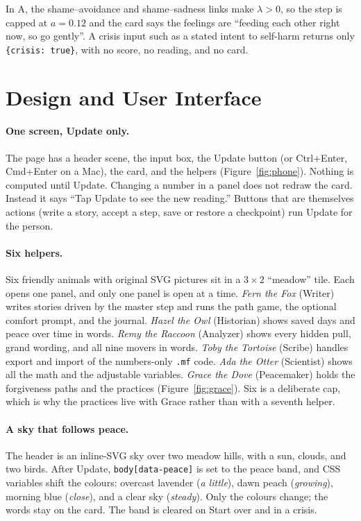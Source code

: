 \documentclass[10pt]{article}
\theoremstyle{definition}
\theoremstyle{remark}
\begin{document}
In A, the shame--avoidance and shame--sadness links make $\lambda>0$, so the step is capped at $a=0.12$ and the card says the feelings are ``feeding each other right now, so go gently''. A crisis input such as a stated intent to self-harm returns only \texttt{\{crisis: true\}}, with no score, no reading, and no card.

\section{Design and User Interface}
\label{sec:ui}
\paragraph{One screen, Update only.} The page has a header scene, the input box, the Update button (or Ctrl+Enter, Cmd+Enter on a Mac), the card, and the helpers (Figure~\ref{fig:phone}). Nothing is computed until Update. Changing a number in a panel does not redraw the card. Instead it says ``Tap Update to see the new reading.'' Buttons that are themselves actions (write a story, accept a step, save or restore a checkpoint) run Update for the person.

\paragraph{Six helpers.} Six friendly animals with original SVG pictures sit in a $3\times2$ ``meadow'' tile. Each opens one panel, and only one panel is open at a time. \emph{Fern the Fox} (Writer) writes stories driven by the master step and runs the path game, the optional comfort prompt, and the journal. \emph{Hazel the Owl} (Historian) shows saved days and peace over time in words. \emph{Remy the Raccoon} (Analyzer) shows every hidden pull, grand wording, and all nine movers in words. \emph{Toby the Tortoise} (Scribe) handles export and import of the numbers-only \texttt{.mf} code. \emph{Ada the Otter} (Scientist) shows all the math and the adjustable variables. \emph{Grace the Dove} (Peacemaker) holds the forgiveness paths and the practices (Figure~\ref{fig:grace}). Six is a deliberate cap, which is why the practices live with Grace rather than with a seventh helper.

\paragraph{A sky that follows peace.} The header is an inline-SVG sky over two meadow hills, with a sun, clouds, and two birds. After Update, \texttt{body[data-peace]} is set to the peace band, and CSS variables shift the colours: overcast lavender (\emph{a little}), dawn peach (\emph{growing}), morning blue (\emph{close}), and a clear sky (\emph{steady}). Only the colours change; the words stay on the card. The band is cleared on Start over and in a crisis.
\end{document}
